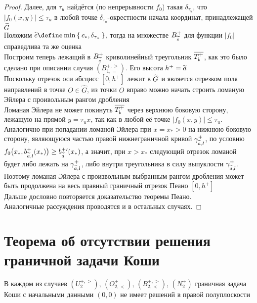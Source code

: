\begin{proof}
    Далее, для $ \tau_u $ найдётся (по непрерывности $ f_0 $) такая $ \delta_{\tau_u} $, что $ |f_0(x, y)| \le \tau_u $ в любой точке $ \delta_{\tau_u} $-окрестности начала координат, принадлежащей $ \widetilde{G} $ \\
    Положим $ \vawe{c} \define \min\set{c_*, \delta_{\tau_u}} $, тогда на множестве $ B_{\widetilde{c}}^+ $ для функции $ |f_0| $ справедлива та же оценка \\
    Построим теперь лежащий в $ B_{\widetilde{c}}^+ $ криволинейный треугольник $ \overline{T_b^+} $, как это было сделано при описании случая $ (B_{1, =}^{+, >}) $. Его высота $ h^+ = \widetilde{a} $ \\
    Поскольку отрезок оси абсцисс $ [0, h^+] $ лежит в $ \widetilde{G} $ и является отрезком поля направлений в точке $ O \in \hat{G} $, из точки $ O $ вправо можно начать строить ломаную Эйлера с проивольным рангом дробления \\
    Ломаная Эйлера не может покинуть $ \overline{T_b^+} $ через верхнюю боковую сторону, лежащую на прямой $ y = \tau_ux $, так как в любой её точке $ |f_0(x, y)| \le \tau_u $. Аналогично при попадании ломаной Эйлера при $ x = x_* > 0 $ на нижнюю боковую сторону, являющуюся частью правой нижнеграничной кривой $ \gamma_{\widetilde{a}, l}^+ $, по условию   $ f_0 \big( x_*, b_{\widetilde{a}, l}^+(x_*) \big) \ge b_{\widetilde{a}}^+{}'(x_*) $, а значит, при $ x > x_* $ следующий отрезок ломаной будет либо лежать на $ \gamma_{\widetilde{a}, l}^+ $, либо внутри треугольника в силу выпуклости $ \gamma_{\widetilde{a}, l}^+ $. Поэтому ломаная Эйлера с произвольным выбранным рангом дробления может быть продолжена на весь правный граничный отрезок Пеано $ [0, h^+] $ \\
    Дальше дословно повторяется доказательство теоремы Пеано. \\
    Аналогичные рассуждения проводятся и в остальных случаях.
\end{proof}

\section{Теорема об отсутствии решения граничной задачи Коши}

\begin{theorem}
    В каждом из случаев $ (U_2^{+, >}) $, $ (O_{2, <}^+) $, $ (B_{2, <}^{+, >}) $, $ (N_2^+) $ граничная задача Коши с начальными данными $ (0, 0) $ не имеет решений в правой полуплоскости
\end{theorem}

